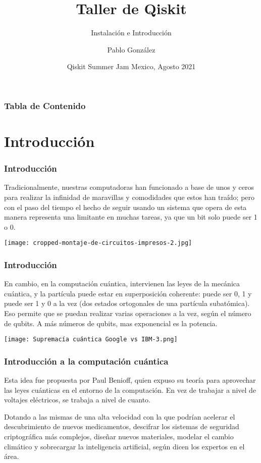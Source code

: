 \documentclass[spanish]{beamer}
\title[QMexico]  %
{Taller de Qiskit}   %
\subtitle{Instalación e Introducción}  %
\author{Pablo González}  %
\institute[QMexico]  %
\date[Agosto 2021]  %
{Qiskit Summer Jam Mexico, Agosto 2021}
\begin{document}
\frame[plain]{\titlepage}


\begin{frame}
\frametitle{Tabla de Contenido}
\tableofcontents
\end{frame}

\newpage\section{Introducción}  
\setlength{\parskip}{5mm}
\justify\begin{frame}\frametitle{Introducción}
Tradicionalmente, nuestras computadoras han funcionado a base de unos y ceros para realizar la infinidad de maravillas y comodidades que estos han traído; pero con el paso del tiempo el hecho de  seguir usando un sistema que opera de esta manera representa una limitante en muchas tareas, ya que un bit solo puede ser 1 o 0. 

\centering\texttt{[image: cropped-montaje-de-circuitos-impresos-2.jpg]}
\end{frame}

\newpage
\setlength{\parskip}{5mm}
\justify\begin{frame}\frametitle{Introducción}
En cambio, en la computación cuántica, intervienen las leyes de la mecánica cuántica, y la partícula puede estar en superposición coherente: puede ser 0, 1 y puede ser 1 y 0 a la vez (dos estados ortogonales de una partícula subatómica). Eso permite que se puedan realizar varias operaciones a la vez, según el número de qubits. A más números de qubits, mas exponencial es la potencia.

\centering\texttt{[image: Supremacía cuántica Google vs IBM-3.png]}
\end{frame}
\newpage
\setlength{\parskip}{5mm}
\begin{frame}
\frametitle{Introducción a la computación cuántica}
Esta idea fue propuesta por Paul Benioff, quien expuso su teoría para aprovechar las leyes cuánticas en el entorno de la computación. En vez de trabajar a nivel de voltajes eléctricos, se trabaja a nivel de cuanto. 

Dotando a las mismas de una alta velocidad con la que podrían acelerar el descubrimiento de nuevos medicamentos, descifrar los sistemas de seguridad criptográfica más complejos, diseñar nuevos materiales, modelar el cambio climático y sobrecargar la inteligencia artificial, según dicen los expertos en el área.
\end{frame}
\end{document}

